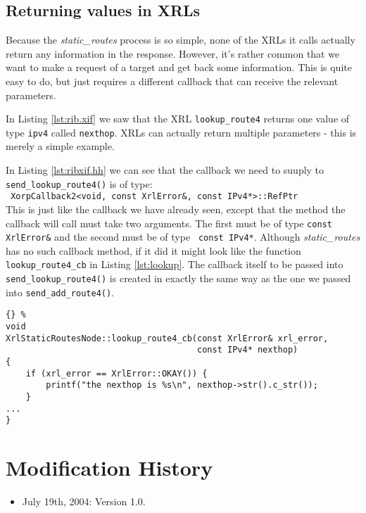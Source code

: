 \documentclass[11pt]{article}
\newcommand{\stt}{\tt\small}
\newcommand{\SRI}{{\it static\_routes}\xspace}
\begin{document}
\subsection{Returning values in XRLs}

Because the \SRI process is so simple, none of the XRLs it calls
actually return any information in the response.  However, it's rather
common that we want to make a request of a target and get back some
information.  This is quite easy to do, but just requires a different
callback that can receive the relevant parameters.

In Listing \ref{lst:rib.xif} we saw that the XRL {\stt lookup\_route4}
returns one value of type {\stt ipv4} called {\stt nexthop}.  XRLs can
actually return multiple parameters - this is merely a simple
example.

In Listing \ref{lst:ribxif.hh} we can see that the callback we need to
suuply to {\stt send\_lookup\_route4()} is of type:\\ {\stt
XorpCallback2<void, const XrlError\&, const IPv4*>::RefPtr}\\ This is
just like the callback we have already seen, except that the method
the callback will call must take two arguments.  The first must be of
type {\stt const XrlError\&} and the second must be of type {\stt
const IPv4*}.  Although \SRI has no such callback method, if it did it
might look like the function {\stt lookup\_route4\_cb} in Listing
\ref{lst:lookup}.  The callback itself to be passed into {\stt
send\_lookup\_route4()} is created in exactly the same way as the one
we passed into {\stt send\_add\_route4()}.

\begin{lstlisting}[caption={Hypothetical callback for  {\stt
	send\_lookup\_route4()} \label{lst:lookup} }]{} %
void
XrlStaticRoutesNode::lookup_route4_cb(const XrlError& xrl_error,
                                      const IPv4* nexthop)
{
    if (xrl_error == XrlError::OKAY()) {
        printf("the nexthop is %s\n", nexthop->str().c_str());
    }
...
}
\end{lstlisting}
\newpage
\appendix
\section{Modification History}

\begin{itemize}

  \item July 19th, 2004: Version 1.0.

\end{itemize}




\end{document}
